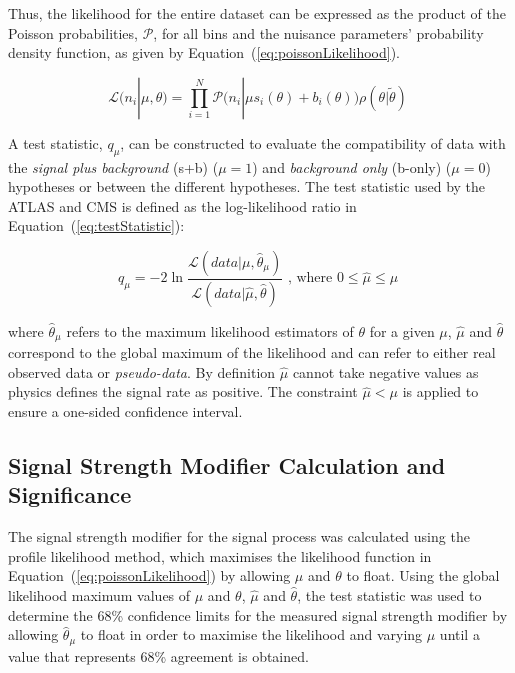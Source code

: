 Thus, the likelihood for the entire dataset can be expressed as the product of the Poisson probabilities, $\mathcal{P}$, for all bins and the nuisance parameters' probability density function, as given by Equation~(\ref{eq:poissonLikelihood}).

\begin{equation}
\mathcal{L} ( n_{i} | \mu , \theta ) = 
\prod_{i=1}^{N} \mathcal{P} \big( n_{i} | \mu s_{i}(\theta) + b_{i}(\theta) \big) \rho ( \theta | \tilde{\theta} ) \;
\label{eq:poissonLikelihood}
\end{equation}

A test statistic, $q_{\mu} $, can be constructed to evaluate the compatibility of data with the \emph{signal plus background} (s+b) ($\mu = 1$) and \emph{background only} (b-only) ($\mu = 0$) hypotheses or between the different hypotheses.
The test statistic used by the ATLAS and CMS is defined as the log-likelihood ratio in Equation~(\ref{eq:testStatistic}):

\begin{equation}
q_{\mu} =  -2 \ln \frac{ \mathcal{L}(data | \mu , \hat{\theta}_{\mu})} { \mathcal{L}(data | \hat{\mu} , \hat{\theta})  } \textrm{ , where } 0 \leq \hat{\mu} \leq \mu \;
\label{eq:testStatistic}
\end{equation}

where $\hat{\theta}_{\mu}$ refers to the maximum likelihood estimators of $\theta$ for a given $\mu$, $\hat{\mu}$ and $\hat{\theta}$ correspond to the global maximum of the likelihood and can refer to either real observed data or \emph{pseudo-data}.
By definition $\hat{\mu}$ cannot take negative values as physics defines the signal rate as positive. 
The constraint $\hat{\mu} < \mu$ is applied to ensure a one-sided confidence interval.

\subsection{Signal Strength Modifier Calculation and Significance}\label{subsec:CLsMethod}

The signal strength modifier for the signal process was calculated using the profile likelihood method, which maximises the likelihood function in Equation~(\ref{eq:poissonLikelihood}) by allowing $\mu$ and $\theta$ to float.
Using the global likelihood maximum values of $\mu$ and $\theta$, $\hat{\mu}$ and $\hat{\theta}$, the test statistic was used to determine the 68\% confidence limits for the measured signal strength modifier by allowing $\hat{\theta}_{\mu}$ to float in order to maximise the likelihood and varying $\mu$ until a value that represents 68\% agreement is obtained.

